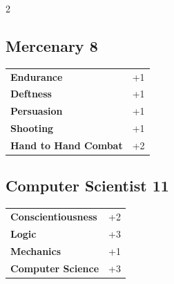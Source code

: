 \begin{multicols}{2}
\begin{tcolorbox}

\end{tcolorbox}

\begin{tcolorbox}
    \subsection*{Mercenary \hfill \small{8 }}
    \tcblower




\begin{tabular}{@{}ll@{}}
    \textbf{Endurance} & +1\\
    \textbf{Deftness} & +1\\
    \textbf{Persuasion} & +1\\
    \textbf{Shooting} & +1\\
    \textbf{Hand to Hand Combat} & +2\\
\end{tabular}


\end{tcolorbox}

\begin{tcolorbox}
    \subsection*{Computer Scientist \hfill \small{11 }}
    \tcblower




\begin{tabular}{@{}ll@{}}
    \textbf{Conscientiousness} & +2\\
    \textbf{Logic} & +3\\
    \textbf{Mechanics} & +1\\
    \textbf{Computer Science} & +3\\
\end{tabular}


\end{tcolorbox}


\end{multicols}
